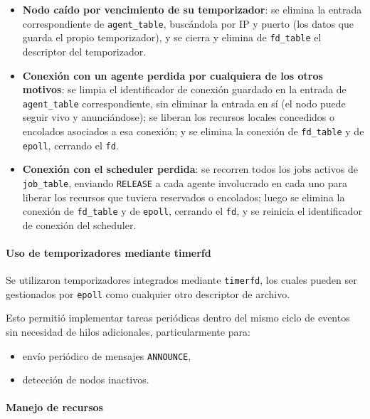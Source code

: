\documentclass[a4paper,10pt]{article}
\begin{document}
\begin{itemize}
    \item \textbf{Nodo caído por vencimiento de su temporizador}: se elimina la entrada
    correspondiente de \texttt{agent\_table}, buscándola por IP y puerto (los datos que guarda el
    propio temporizador), y se cierra y elimina de \texttt{fd\_table} el descriptor del
    temporizador.
    \item \textbf{Conexión con un agente perdida por cualquiera de los otros motivos}: se limpia
    el identificador de conexión guardado en la entrada de \texttt{agent\_table} correspondiente,
    sin eliminar la entrada en sí (el nodo puede seguir vivo y anunciándose); se liberan los
    recursos locales concedidos o encolados asociados a esa conexión; y se elimina la conexión de
    \texttt{fd\_table} y de \texttt{epoll}, cerrando el \texttt{fd}.
    \item \textbf{Conexión con el scheduler perdida}: se recorren todos los jobs activos de
    \texttt{job\_table}, enviando \texttt{RELEASE} a cada agente involucrado en cada uno para
    liberar los recursos que tuviera reservados o encolados; luego se elimina la conexión de
    \texttt{fd\_table} y de \texttt{epoll}, cerrando el \texttt{fd}, y se reinicia el identificador
    de conexión del scheduler.
\end{itemize}

\paragraph{Uso de temporizadores mediante timerfd}

Se utilizaron temporizadores integrados mediante \texttt{timerfd}, los cuales pueden ser 
gestionados por \texttt{epoll} como cualquier otro descriptor de archivo.

\noindent Esto permitió implementar tareas periódicas dentro del mismo ciclo de eventos sin necesidad 
de hilos adicionales, particularmente para:
\begin{itemize}
    \item envío periódico de mensajes \texttt{ANNOUNCE},
    \item detección de nodos inactivos.
\end{itemize}

\paragraph{Manejo de recursos}
\end{document}
